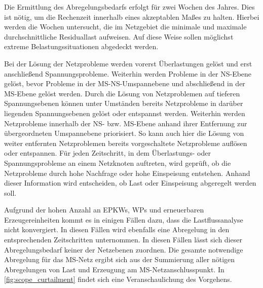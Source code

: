 Die Ermittlung des Abregelungsbedarfs erfolgt für zwei Wochen des Jahres.
Dies ist nötig, um die Rechenzeit innerhalb eines akzeptablen Maßes zu halten.
Hierbei werden die Wochen untersucht, die im Netzgebiet die minimale und maximale durchschnittliche Residuallast aufweisen.
Auf diese Weise sollen möglichst extreme Belastungssituationen abgedeckt werden. \medskip

Bei der Lösung der Netzprobleme werden vorerst Überlastungen gelöst und erst anschließend Spannungsprobleme.
Weiterhin werden Probleme in der \gls{NS}-Ebene gelöst, bevor Probleme in der \gls{MS}-\gls{NS}-Umspannebene und abschließend in der \gls{MS}-Ebene gelöst werden.
Durch die Lösung von Netzproblemen auf tieferen Spannungsebenen können unter Umständen bereits Netzprobleme in darüber liegenden Spannungsebenen gelöst oder entspannst werden.
Weiterhin werden Netzprobleme innerhalb der \gls{NS}- bzw. \gls{MS}-Ebene anhand ihrer Entfernung zur übergeordneten Umspannebene priorisiert.
So kann auch hier die Lösung von weiter entfernten Netzproblemen bereits vorgeschaltete Netzprobleme auflösen oder entspannen.
Für jeden Zeitschritt, in dem Überlastungs- oder Spannungsprobleme an einem Netzknoten auftreten, wird geprüft, ob die Netzprobleme durch hohe Nachfrage oder hohe Einspeisung entstehen.
Anhand dieser Information wird entscheiden, ob Last oder Einspeisung abgeregelt werden soll.\medskip

Aufgrund der hohen Anzahl an \glspl{EPKW}, \glspl{WP} und erneuerbaren Erzeugereinheiten kommt es in einigen Fällen dazu, dass die Lastflussanalyse nicht konvergiert.
In diesen Fällen wird ebenfalls eine Abregelung in den entsprechenden Zeitschritten unternommen.
In diesen Fällen lässt sich dieser Abregelungsbedarf keiner der Netzebenen zuordnen.
Die gesamte notwendige Abregelung für das \gls{MS}-Netz ergibt sich aus der Summierung aller nötigen Abregelungen von Last und Erzeugung am \gls{MS}-Netzanschlusspunkt.
In \autoref{fig:scope_curtailment} findet sich eine Veranschaulichung des Vorgehens.




